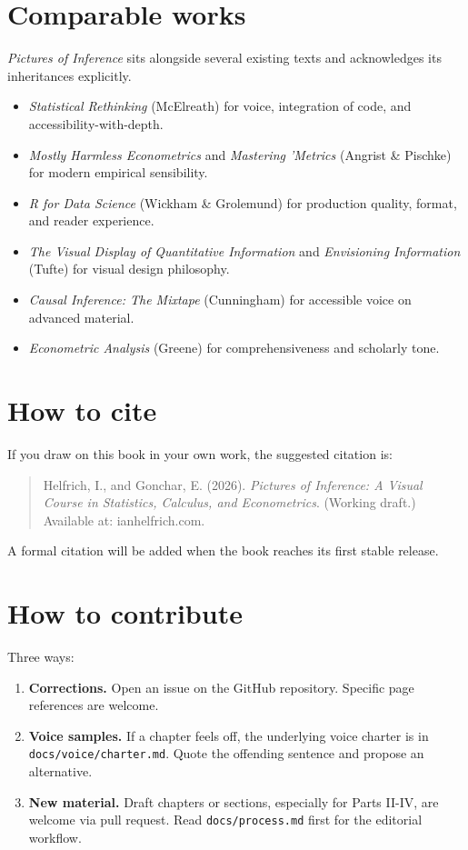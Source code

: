 \documentclass[
  letterpaper,
  11pt,
  twoside,
  openany]{scrbook}
\providecommand{\tightlist}{%
  \setlength{\itemsep}{0pt}\setlength{\parskip}{0pt}}
\begin{document}
\section{Comparable works}\label{comparable-works}

\emph{Pictures of Inference} sits alongside several existing texts and
acknowledges its inheritances explicitly.

\begin{itemize}
\tightlist
\item
  \emph{Statistical Rethinking} (McElreath) for voice, integration of
  code, and accessibility-with-depth.
\item
  \emph{Mostly Harmless Econometrics} and \emph{Mastering 'Metrics}
  (Angrist \& Pischke) for modern empirical sensibility.
\item
  \emph{R for Data Science} (Wickham \& Grolemund) for production
  quality, format, and reader experience.
\item
  \emph{The Visual Display of Quantitative Information} and
  \emph{Envisioning Information} (Tufte) for visual design philosophy.
\item
  \emph{Causal Inference: The Mixtape} (Cunningham) for accessible voice
  on advanced material.
\item
  \emph{Econometric Analysis} (Greene) for comprehensiveness and
  scholarly tone.
\end{itemize}

\section{How to cite}\label{how-to-cite}

If you draw on this book in your own work, the suggested citation is:

\begin{quote}
Helfrich, I., and Gonchar, E. (2026). \emph{Pictures of Inference: A
Visual Course in Statistics, Calculus, and Econometrics}. (Working
draft.) Available at: ianhelfrich.com.
\end{quote}

A formal citation will be added when the book reaches its first stable
release.

\section{How to contribute}\label{how-to-contribute}

Three ways:

\begin{enumerate}
\def\labelenumi{\arabic{enumi}.}
\tightlist
\item
  \textbf{Corrections.} Open an issue on the GitHub repository. Specific
  page references are welcome.
\item
  \textbf{Voice samples.} If a chapter feels off, the underlying voice
  charter is in \texttt{docs/voice/charter.md}. Quote the offending
  sentence and propose an alternative.
\item
  \textbf{New material.} Draft chapters or sections, especially for
  Parts II-IV, are welcome via pull request. Read
  \texttt{docs/process.md} first for the editorial workflow.
\end{enumerate}
\end{document}
